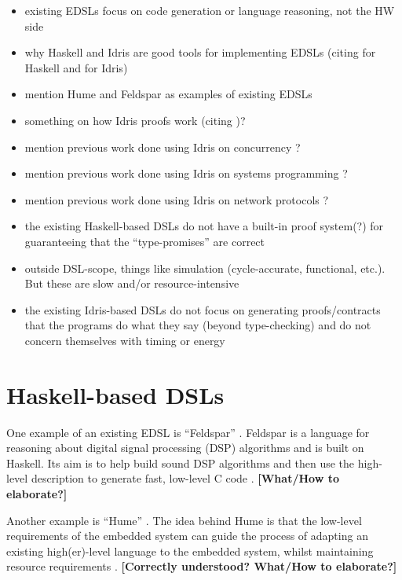 \begin{itemize}
	\item existing EDSLs focus on code generation or language reasoning, not the
	      HW side
	\item why Haskell and Idris are good tools for implementing EDSLs (citing
    	  \cite{10.1007/3-540-45350-4_5,685738,hudak1996building} for Haskell
    	  and \cite{brady2015embedded} for Idris)
	\item mention Hume \cite{10.1007/978-3-540-39815-8_3} and Feldspar
  		  \cite{5558637} as examples of existing EDSLs
	\item something on how Idris proofs work (citing \cite{brady2015embedded})?
	\item mention previous work done using Idris on concurrency
		  \cite{brady2010correct}?
	\item mention previous work done using Idris on systems programming
		  \cite{10.1007/978-3-642-27694-1_18,Brady:2011:ISP:1929529.1929536}?
	\item mention previous work done using Idris on network protocols
		  \cite{5158855}?
	\item the existing Haskell-based DSLs do not have a built-in proof system(?)
		  for guaranteeing that the ``type-promises'' are correct
	\item outside DSL-scope, things like simulation (cycle-accurate, functional,
		  etc.). But these are slow and/or resource-intensive
	\item the existing Idris-based DSLs do not focus on generating
		  proofs/contracts that the programs do what they say (beyond
		  type-checking) and do not concern themselves with timing or energy
\end{itemize}

\section{Haskell-based DSLs}
	One example of an existing EDSL is ``Feldspar'' \cite{5558637}. Feldspar is a language for reasoning about digital signal processing (DSP) algorithms and is built on Haskell. Its aim is to help build sound DSP algorithms and then use the high-level description to generate fast, low-level C code \cite{5558637}. \textbf{[What/How to elaborate?]}
	
	Another example is ``Hume'' \cite{10.1007/978-3-540-39815-8_3}. The idea behind Hume is that the low-level requirements of the embedded system can guide the process of adapting an existing high(er)-level language to the embedded system, whilst maintaining resource requirements \cite{10.1007/978-3-540-39815-8_3}. \textbf{[Correctly understood? What/How to elaborate?]}

